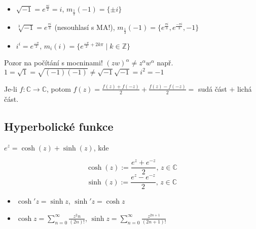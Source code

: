 
\begin{example}
\begin{itemize}
    \item $\sqrt{-1}=e^{\frac{\pi i}{2}}=i$,  $m_{\frac{1}{2}}(-1)=\{\pm i\}$
    \item $\sqrt[3]{-1}=e^{\frac{\pi i}{3}}$ (nesouhlasí s MA!),  $m_{\frac{1}{3}}(-1)=\{e^{\frac{\pi i}{3}},e^{\frac{-\pi i}{3}},-1\} $
    \item  $i^i=e^{\frac{-\pi }{2}}$, 
    $m_{i}(i)=\{e^{\frac{-\pi }{2}+2k\pi}\mid k\in\mathbb{Z}\}$
\end{itemize}

 \vspace{5mm}
 Pozor na počítání s mocninami! \newline
 $(zw)^{\alpha}\neq z^{\alpha}w^{\alpha}$ \newline
 např. $1=\sqrt{1}=\sqrt{(-1)(-1)}\neq \sqrt{-1}\sqrt{-1}=i^2=-1$
\end{example}

\begin{note}
Je-li $f \colon \mathbb{C} \to \mathbb{C}$, potom $f(z)=\frac{f(z)+f(-z)}{2}+\frac{f(z)-f(-z)}{2}=$ sudá část $+$ lichá část.
\end{note}

\subsection{Hyperbolické funkce}

$e^{z}=\cosh(z)+\sinh(z)$, kde

\begin{definition}
\[\cosh(z):=\frac{e^{z}+e^{-z}}{2}\text{, }z\in \mathbb{C}\] \newline
\[\sinh(z):=\frac{e^{z}-e^{-z}}{2}\text{, }z\in \mathbb{C}\]
\end{definition}


\begin{properties}
\mbox{}
\vspace{-2em}
\begin{itemize}
    \item $\cosh'{z}=\sinh{z}$, $\sinh'{z}=\cosh{z}$
    \item $\cosh{z}=\sum_{n=0}^{\infty}\frac{z^2n}{(2n)!}$, $\sinh{z}=\sum_{n=0}^{\infty}\frac{z^{2n+1}}{(2n+1)!}$
\end{itemize}
\end{properties}

